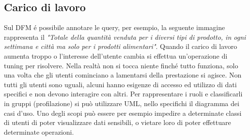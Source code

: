 \subsection{Carico di lavoro}
Sul DFM é possibile annotare le query, per esempio, la seguente immagine rappresenta il \textit{"Totale della quantità venduta per i diversi tipi di prodotto, in ogni settimana e città ma solo per i prodotti alimentari"}.
\noindent Quando il carico di lavoro aumenta troppo o l'interesse dell'utente cambia si effettua un'operazione di tuning per risolvere. Nella realtà non si tocca niente finché tutto funziona, solo una volta che gli utenti cominciano a lamentarsi della prestazione si agisce.\newline
Non tutti gli utenti sono uguali, alcuni hanno esigenze di accesso ed utilizzo di dati specifici e non devono interagire con altri. Per rappresentare i ruoli e classificarli in gruppi (profilazione) si può utilizzare UML, nello specifichi il diagramma dei casi d'uso.\newline
Uno degli scopi può essere per esempio impedire a determinate classi di utenti di poter visualizzare dati sensibili, o vietare loro di poter effettuare determinate operazioni.
